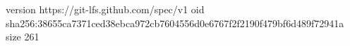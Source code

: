 version https://git-lfs.github.com/spec/v1
oid sha256:38655ca7371ced38ebca972cb7604556d0e6767f2f2190f479bf6d489f72941a
size 261

